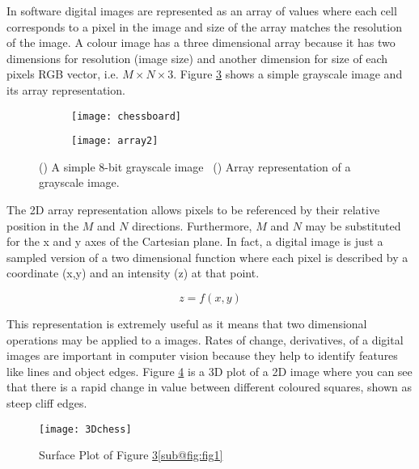 In software digital images are represented as an array of values where each cell corresponds to a pixel in the image and size of the array matches the resolution of the image. A colour image has a three dimensional array because it has two dimensions for resolution (image size) and another dimension for size of each pixels RGB vector, i.e. $M \times N \times 3$. Figure \ref{fig:2Darray} shows a simple grayscale image and its array representation.

\begin{figure}[H]
    \centering
    \begin{subfigure}[b]{0.5\linewidth}
      \centering\texttt{[image: chessboard]}
      \caption{\label{fig:fig1}}
    \end{subfigure}%
    \begin{subfigure}[b]{0.5\linewidth}
      \centering\texttt{[image: array2]}
      \caption{\label{fig:fig2}}
    \end{subfigure}
    \caption{() A simple 8-bit grayscale image ~() Array representation of a grayscale image.}
    \label{fig:2Darray}
\end{figure}
  

The 2D array representation allows pixels to be referenced by their relative position in the $M$ and $N$ directions. Furthermore, $M$ and $N$ may be substituted for the x and y axes of the Cartesian plane. In fact, a digital image is just a sampled version of a two dimensional function where each pixel is described by a coordinate (x,y) and an intensity (z) at that point.

\begin{equation}
    z = f(x,y)
    \label{eq:2Dfunc}
\end{equation}

This representation is extremely useful as it means that two dimensional operations may be applied to a images. Rates of change, derivatives, of a digital images are important in computer vision because they help to identify features like lines and object edges. Figure \ref{fig:3Dplot} is a 3D plot of a 2D image where you can see that there is a rapid change in value between different coloured squares, shown as steep cliff edges. 

\begin{figure}[ht!]
  \centering
  \centering\texttt{[image: 3Dchess]}
  \caption{\label{fig:fig1} Surface Plot of Figure \ref{fig:2Darray}\ref{sub@fig:fig1}}
  \label{fig:3Dplot}
\end{figure}







